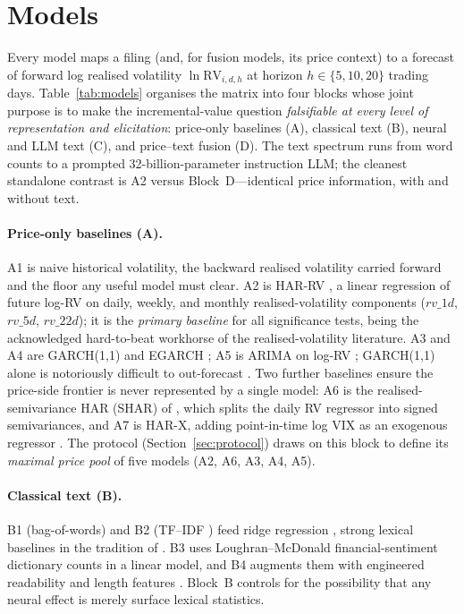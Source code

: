 \section{Models}
\label{sec:methods}

Every model maps a filing (and, for fusion models, its price context) to a forecast of forward log realised volatility $\ln\mathrm{RV}_{i,d,h}$ at horizon $h\in\{5,10,20\}$ trading days. Table~\ref{tab:models} organises the matrix into four blocks whose joint purpose is to make the incremental-value question \emph{falsifiable at every level of representation and elicitation}: price-only baselines (A), classical text (B), neural and LLM text (C), and price--text fusion (D). The text spectrum runs from word counts to a prompted 32-billion-parameter instruction LLM; the cleanest standalone contrast is A2 versus Block~D---identical price information, with and without text.

\paragraph{Price-only baselines (A).}
A1 is naive historical volatility, the backward realised volatility carried forward and the floor any useful model must clear. A2 is HAR-RV \citep{corsi2009har}, a linear regression of future log-RV on daily, weekly, and monthly realised-volatility components ($rv\_1d$, $rv\_5d$, $rv\_22d$); it is the \emph{primary baseline} for all significance tests, being the acknowledged hard-to-beat workhorse of the realised-volatility literature. A3 and A4 are GARCH(1,1) \citep{engle1982arch,bollerslev1986garch} and EGARCH \citep{nelson1991egarch}; A5 is ARIMA on log-RV \citep{box1970time}; GARCH(1,1) alone is notoriously difficult to out-forecast \citep{hansen2005garch}. Two further baselines ensure the price-side frontier is never represented by a single model: A6 is the realised-semivariance HAR (SHAR) of \citet{pattonsheppard2015shar}, which splits the daily RV regressor into signed semivariances, and A7 is HAR-X, adding point-in-time log VIX as an exogenous regressor \citep{blair2001forecasting}. The protocol (Section~\ref{sec:protocol}) draws on this block to define its \emph{maximal price pool} of five models (A2, A6, A3, A4, A5).

\paragraph{Classical text (B).}
B1 (bag-of-words) and B2 (TF--IDF \citep{salton1988term}) feed ridge regression \citep{hoerl1970ridge}, strong lexical baselines in the tradition of \citet{kogan2009predicting}. B3 uses Loughran--McDonald financial-sentiment dictionary counts \citep{loughran2011liability} in a linear model, and B4 augments them with engineered readability and length features \citep{loughran2016survey}. Block~B controls for the possibility that any neural effect is merely surface lexical statistics.

